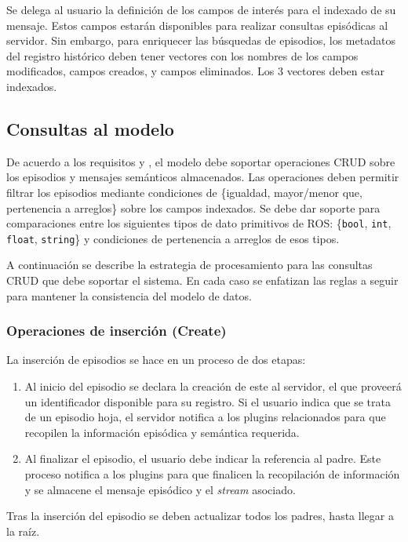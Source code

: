 Se delega al usuario la definición de los campos de interés para el indexado de su mensaje. Estos campos estarán disponibles para realizar consultas episódicas al servidor. Sin embargo, para enriquecer las búsquedas de episodios, los metadatos del registro histórico deben tener vectores con los nombres de los campos modificados, campos creados, y campos eliminados. Los 3 vectores deben estar indexados.


\subsection{Consultas al modelo}

De acuerdo a los requisitos  y , el modelo debe soportar operaciones CRUD sobre los episodios y mensajes semánticos almacenados. Las operaciones deben permitir filtrar los episodios mediante condiciones de \{igualdad, mayor/menor que, pertenencia a arreglos\} sobre los campos indexados. Se debe dar soporte para comparaciones entre los siguientes tipos de dato primitivos de ROS: \{\texttt{bool}, \texttt{int}, \texttt{float}, \texttt{string}\} y condiciones de pertenencia a arreglos de esos tipos.

A continuación se describe la estrategia de procesamiento para las consultas CRUD que debe soportar el sistema. En cada caso se enfatizan las reglas a seguir para mantener la consistencia del modelo de datos.

\subsubsection{Operaciones de inserción (Create)}

La inserción de episodios se hace en un proceso de dos etapas:
\begin{enumerate}
\item  Al inicio del episodio se declara la creación de este al servidor, el que proveerá un identificador disponible para su registro. Si el usuario indica que se trata de un episodio hoja, el servidor notifica a los plugins relacionados para que recopilen la información episódica y semántica requerida.
\item  Al finalizar el episodio, el usuario debe indicar la referencia al padre. Este proceso notifica a los plugins para que finalicen la recopilación de información y se almacene el mensaje episódico y el \textit{stream} asociado.
\end{enumerate}
Tras la inserción del episodio se deben actualizar todos los padres, hasta llegar a la raíz.


